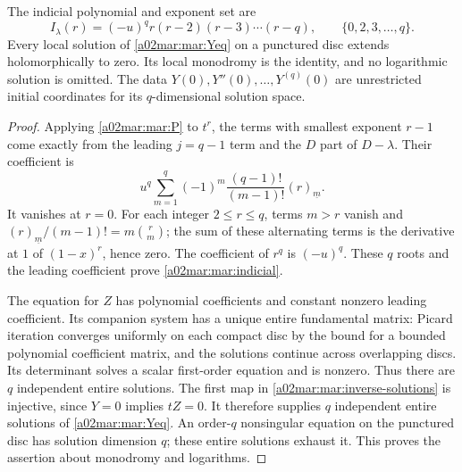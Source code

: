 \begin{theorem}\label{a02mar:mar:scalar-theorem}
The indicial polynomial and exponent set are
\begin{equation}\tag{MAR8}\label{a02mar:mar:indicial}
 I_\lambda(r)=(-u)^q r(r-2)(r-3)\cdots(r-q),
 \qquad\{0,2,3,\ldots,q\}.
\end{equation}
Every local solution of \eqref{a02mar:mar:Yeq} on a punctured disc extends
holomorphically to zero. Its local monodromy is the identity, and no
logarithmic solution is omitted. The data $Y(0),Y''(0),\ldots,Y^{(q)}(0)$
are unrestricted initial coordinates for its $q$-dimensional solution space.
\end{theorem}
\begin{proof}
Applying \eqref{a02mar:mar:P} to $t^r$, the terms with smallest exponent
$r-1$ come exactly from the leading $j=q-1$ term and the $D$ part
of $D-\lambda$. Their coefficient is
\[
 u^q\sum_{m=1}^{q}(-1)^m\frac{(q-1)!}{(m-1)!}(r)_{\underline m}.
\]
It vanishes at $r=0$. For each integer $2\le r\le q$, terms
$m>r$ vanish and
$(r)_{\underline m}/(m-1)!=m\binom rm$; the sum of these
alternating terms is the derivative at $1$ of $(1-x)^r$, hence
zero. The coefficient of $r^q$ is $(-u)^q$. These $q$ roots and
the leading coefficient prove \eqref{a02mar:mar:indicial}.

The equation for $Z$ has polynomial coefficients and constant nonzero
leading coefficient. Its companion system has a unique entire
fundamental matrix: Picard iteration converges uniformly on each compact
disc by the bound for a bounded polynomial coefficient matrix, and the
solutions continue across overlapping discs. Its determinant solves a
scalar first-order equation and is nonzero. Thus there are $q$
independent entire solutions. The first map in
\eqref{a02mar:mar:inverse-solutions} is injective, since $Y=0$ implies
$tZ=0$. It therefore supplies $q$ independent entire solutions of
\eqref{a02mar:mar:Yeq}. An order-$q$ nonsingular equation on the punctured
disc has solution dimension $q$; these entire solutions exhaust it.
This proves the assertion about monodromy and logarithms.


\end{proof}
